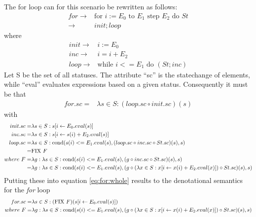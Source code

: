 % 
The for loop can for this scenario be rewritten as follows:
\begin{align}
	for	\to & \text{for } i := E_0 \text{ to } E_1 \text{ step } E_2 \text{ do } St \\
			\to & init; loop
\end{align}
where
\begin{align}
	init \to & i := E_0 \\
	inc	 \to & i = i+E_2 \\
	loop \to & \text{while } i <= E_1 \text{ do } (St; inc)
\end{align}
Let S be the set of all statuses. The attribute ``sc'' is the statechange of elements, while ``eval'' evaluates expressions based on a given status. Consequently it must be that
\begin{align}
	for.sc = & \lambda s \in S: (loop.sc \circ init.sc)( s ) \label{eq:for:whole}
\end{align}
with
\begin{align}
	init.sc = & \lambda s \in S: s[i \gets E_0.eval( s )] \\
	inc.sc 	= & \lambda s \in S: s[i \gets s( i ) + E_2.eval( s )] \\
	loop.sc = & \lambda s \in S: \text{cond}(s( i ) <= E_1.eval( s ), (loop.sc \circ inc.sc \circ St.sc)( s ), s) \\
					= & \text{FIX } F\\
where \ F = & \lambda g: \lambda s \in S: \text{cond}(s( i ) <= E_1.eval( s ), (g \circ inc.sc \circ St.sc)( s ), s) \\
					= & \lambda g: \lambda s \in S: \text{cond}(s( i ) <= E_1.eval( s ), (g \circ (\lambda x \in S: x[i \gets x( i ) + E_2.eval( x )]) \circ St.sc)(s), s)
\end{align}
Putting these into equation \ref{eq:for:whole} results to the denotational semantics for the \emph{for} loop
\begin{align}
	 for.sc = & \lambda s \in S: (\text{FIX } F)(s[i \gets E_0.eval( s )]) \\
where \ F = & \lambda g: \lambda s \in S: \text{cond}(s( i ) <= E_1.eval( s ), (g \circ (\lambda x \in S: x[i \gets x( i ) + E_2.eval( x )]) \circ St.sc)(s), s)
\end{align}